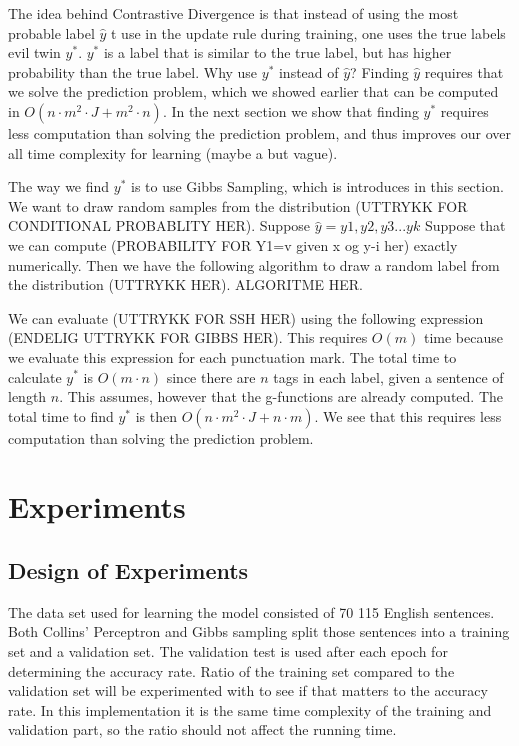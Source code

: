 \documentclass[12pt]{article}
\begin{document}
The idea behind Contrastive Divergence is that instead of using the most probable label $\hat y$ t use in the update rule during training, one uses the true labels evil twin $y^*$. $y^*$ is a label that is similar to the true label, but has higher probability than the true label. Why use $y^*$ instead of $\hat y$? Finding $\hat y$ requires that we solve the prediction problem, which we showed earlier that can be computed in $O(n \cdot m^2 \cdot J + m^2 \cdot n)$. In the next section we show that finding $y^*$ requires less computation than solving the prediction problem, and thus improves our over all time complexity for learning (maybe a but vague). 

The way we find $y^*$ is to use Gibbs Sampling, which is introduces in this section. We want to draw random samples from the distribution (UTTRYKK FOR CONDITIONAL PROBABLITY HER). Suppose $\hat y = y1, y2, y3...yk$ Suppose that we can compute (PROBABILITY FOR Y1=v given x og y-i her) exactly numerically. Then we have the following algorithm to draw a random label from the distribution (UTTRYKK HER). ALGORITME HER. 

We can evaluate (UTTRYKK FOR SSH HER) using the following expression (ENDELIG UTTRYKK FOR GIBBS HER). This requires $O(m)$ time because we evaluate this expression for each punctuation mark. The total time to calculate $y^*$ is $O(m \cdot n)$ since there are $n$ tags in each label, given a sentence of length $n$. This assumes, however that the g-functions are already computed. The total time to find $y^*$ is then $O(n \cdot m^2 \cdot J + n \cdot m)$. We see that this requires less computation than solving the prediction problem. 

\section*{Experiments}

\subsection*{Design of Experiments}
The data set used for learning the model consisted of 70 115 English sentences. Both Collins' Perceptron and Gibbs sampling split those sentences into a training set and a validation set. The validation test is used after each epoch for determining the accuracy rate. Ratio of the training set compared to the validation set will be experimented with to see if that matters to the accuracy rate. In this implementation it is the same time complexity of the training and validation part, so the ratio should not affect the running time.
\end{document}
